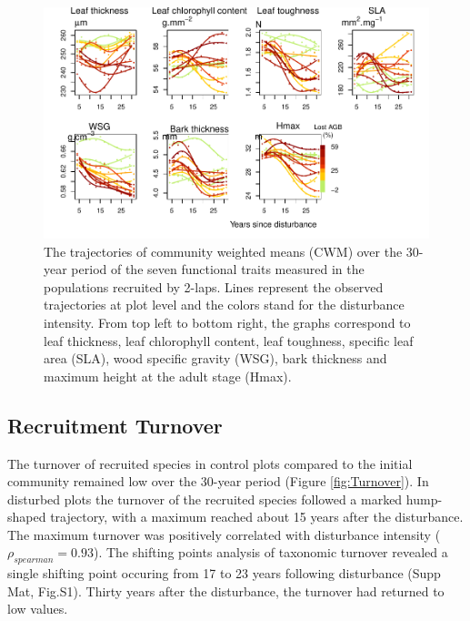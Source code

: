 \documentclass[fleqn,10pt]{ArtEcoFoG} %
\begin{document}
\begin{figure}

{\centering \includegraphics{RecruitmentTrajectories_files/figure-latex/CWM-1} 

}

\caption{The trajectories of community weighted means (CWM) over the 30-year period of the seven functional traits measured in the populations recruited by 2-laps. Lines represent the observed trajectories at plot level and the colors stand for the disturbance intensity. From top left to bottom right, the graphs correspond to leaf thickness, leaf chlorophyll content, leaf toughness, specific leaf area (SLA), wood specific gravity (WSG), bark thickness and maximum height at the adult stage (Hmax).}\label{fig:CWM}
\end{figure}

\hypertarget{recruitment-turnover}{%
\subsection{Recruitment Turnover}\label{recruitment-turnover}}

The turnover of recruited species in control plots compared to the initial community remained low over the 30-year period (Figure \ref{fig:Turnover}).
In disturbed plots the turnover of the recruited species followed a marked hump-shaped trajectory, with a maximum reached about 15 years after the disturbance. The maximum turnover was positively correlated with disturbance intensity (\(\rho_{spearman}=0.93\)).
The shifting points analysis of taxonomic turnover revealed a single shifting point occuring from 17 to 23 years following disturbance (Supp Mat, Fig.S1).
Thirty years after the disturbance, the turnover had returned to low values.
\end{document}
